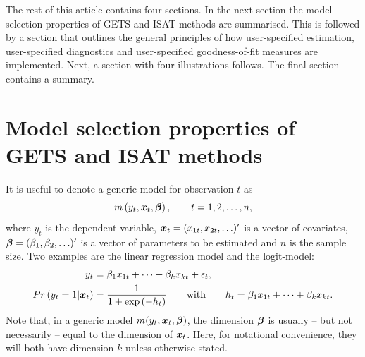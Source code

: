 The rest of this article contains four sections. In the next section the model selection properties of GETS and ISAT methods are summarised. This is followed by a section that outlines the general principles of how user-specified estimation, user-specified diagnostics and user-specified goodness-of-fit measures are implemented. Next, a section with four illustrations follows. The final section contains a summary.

\section{Model selection properties of GETS and ISAT methods} 

It is useful to denote a generic model for observation $t$ as
%
\begin{equation}
	m\left(y_t, \boldsymbol{x}_t, \boldsymbol{\beta} \right), \qquad t=1,2,\ldots,n,
\end{equation}
%
where $y_t$ is the dependent variable, $\boldsymbol{x}_t = (x_{1t}, x_{2t}, \ldots)'$ is a vector of covariates, $\boldsymbol{\beta} = (\beta_1, \beta_2, \ldots)'$ is a vector of parameters to be estimated and $n$ is the sample size. Two examples are the linear regression model and the logit-model:
%
\begin{align}
	y_t &= \beta_1 x_{1t} + \cdots + \beta_k x_{kt} + \epsilon_t, \label{eq:linear:regression:model} \\
	Pr\left(y_t=1|\boldsymbol{x}_t\right) &= \frac{1}{1+\exp\left(-h_t\right)} \qquad\text{with}\qquad h_t = \beta_1 x_{1t} + \cdots + \beta_k x_{kt}. \label{eq:linear:logit:model}
\end{align}
%
Note that, in a generic model $m(y_t, \boldsymbol{x}_t, \boldsymbol{\beta})$, the dimension $\boldsymbol{\beta}$ is usually -- but not necessarily -- equal to the dimension of $\boldsymbol{x}_t$. Here, for notational convenience, they will both have dimension $k$ unless otherwise stated.

